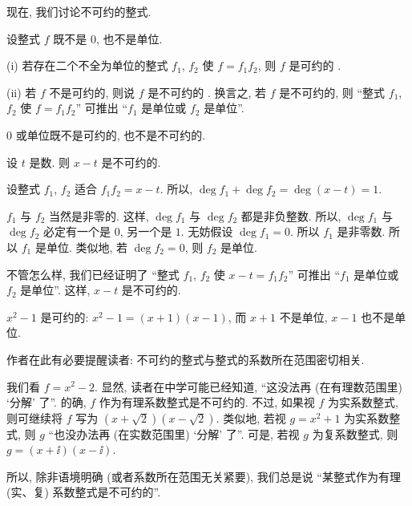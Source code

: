 现在, 我们讨论不可约的整式.

\begin{definition}
    设整式 $f$ 既不是 $0$, 也不是单位.

    (i) 若存在二个不全为单位的整式 $f_1$, $f_2$ 使 $f = f_1 f_2$, 则 $f$ 是可约的 .

    (ii) 若 $f$ 不是可约的, 则说 $f$ 是不可约的 . 换言之, 若 $f$ 是不可约的, 则 ``整式 $f_1$, $f_2$ 使 $f = f_1 f_2$'' 可推出 ``$f_1$ 是单位或 $f_2$ 是单位''.
\end{definition}

\begin{remark}
    $0$ 或单位既不是可约的, 也不是不可约的.
\end{remark}

\begin{example}
    设 $t$ 是数. 则 $x-t$ 是不可约的.

    设整式 $f_1$, $f_2$ 适合 $f_1 f_2 = x-t$. 所以, $\deg f_1 + \deg f_2 = \deg (x-t) = 1$.

    $f_1$ 与 $f_2$ 当然是非零的. 这样, $\deg f_1$ 与 $\deg f_2$ 都是非负整数. 所以, $\deg f_1$ 与 $\deg f_2$ 必定有一个是 $0$, 另一个是 $1$. 无妨假设 $\deg f_1 = 0$. 所以 $f_1$ 是非零数. 所以 $f_1$ 是单位. 类似地, 若 $\deg f_2 = 0$, 则 $f_2$ 是单位.

    不管怎么样, 我们已经证明了 ``整式 $f_1$, $f_2$ 使 $x-t = f_1 f_2$'' 可推出 ``$f_1$ 是单位或 $f_2$ 是单位''. 这样, $x-t$ 是不可约的.
\end{example}

\begin{example}
    $x^2 - 1$ 是可约的: $x^2 - 1 = (x+1) (x-1)$, 而 $x+1$ 不是单位, $x-1$ 也不是单位.
\end{example}

\begin{remark}
    作者在此有必要提醒读者: 不可约的整式与整式的系数所在范围密切相关.

    我们看 $f = x^2 - 2$. 显然, 读者在中学可能已经知道, ``这没法再 (在有理数范围里) `分解' 了''. 的确, $f$ 作为有理系数整式是不可约的. 不过, 如果视 $f$ 为实系数整式, 则可继续将 $f$ 写为 $(x + \sqrt2) (x - \sqrt2)$. 类似地, 若视 $g = x^2 + 1$ 为实系数整式, 则 $g$ ``也没办法再 (在实数范围里) `分解' 了''. 可是, 若视 $g$ 为复系数整式, 则 $g = (x + \ii) (x - \ii)$.

    所以, 除非语境明确 (或者系数所在范围无关紧要), 我们总是说 ``某整式作为有理 (实、复) 系数整式是不可约的''.
\end{remark}

